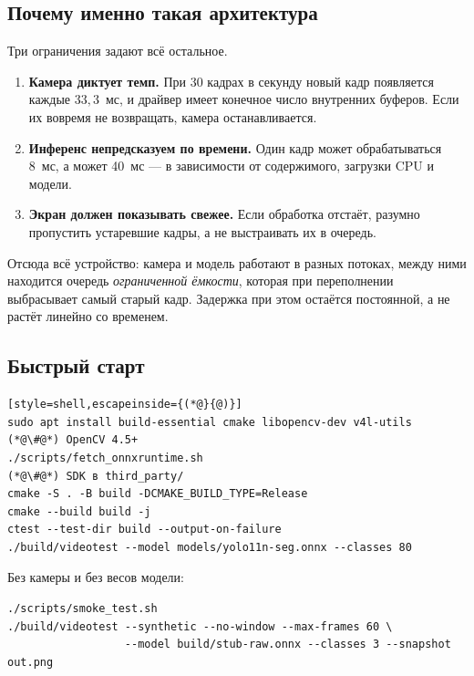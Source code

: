 \documentclass[11pt,a4paper]{article}
\theoremstyle{definition}
\theoremstyle{remark}
\begin{document}
\subsection{Почему именно такая архитектура}

Три ограничения задают всё остальное.

\begin{enumerate}
  \item \textbf{Камера диктует темп.} При 30 кадрах в секунду новый кадр
        появляется каждые $33{,}3$~мс, и драйвер имеет конечное число
        внутренних буферов. Если их вовремя не возвращать, камера
        останавливается.
  \item \textbf{Инференс непредсказуем по времени.} Один кадр может
        обрабатываться 8~мс, а может 40~мс --- в зависимости от содержимого,
        загрузки CPU и модели.
  \item \textbf{Экран должен показывать свежее.} Если обработка отстаёт,
        разумно пропустить устаревшие кадры, а не выстраивать их в очередь.
\end{enumerate}

Отсюда всё устройство: камера и модель работают в разных потоках, между ними
находится очередь \emph{ограниченной ёмкости}, которая при переполнении
выбрасывает самый старый кадр. Задержка при этом остаётся постоянной, а не
растёт линейно со временем.

\subsection{Быстрый старт}

\begin{lstlisting}[style=shell,escapeinside={(*@}{@)}]
sudo apt install build-essential cmake libopencv-dev v4l-utils   (*@\#@*) OpenCV 4.5+
./scripts/fetch_onnxruntime.sh                                   (*@\#@*) SDK в third_party/
cmake -S . -B build -DCMAKE_BUILD_TYPE=Release
cmake --build build -j
ctest --test-dir build --output-on-failure
./build/videotest --model models/yolo11n-seg.onnx --classes 80
\end{lstlisting}

Без камеры и без весов модели:

\begin{lstlisting}[style=shell]
./scripts/smoke_test.sh
./build/videotest --synthetic --no-window --max-frames 60 \
                  --model build/stub-raw.onnx --classes 3 --snapshot out.png
\end{lstlisting}
\end{document}
